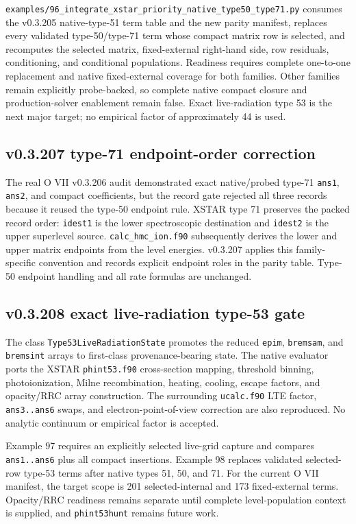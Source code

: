 \documentclass[11pt]{article}
\begin{document}
\texttt{examples/96\_integrate\_xstar\_priority\_native\_type50\_type71.py} consumes the v0.3.205 native-type-51 term table and the new parity manifest, replaces every validated type-50/type-71 term whose compact matrix row is selected, and recomputes the selected matrix, fixed-external right-hand side, row residuals, conditioning, and conditional populations. Readiness requires complete one-to-one replacement and native fixed-external coverage for both families. Other families remain explicitly probe-backed, so complete native compact closure and production-solver enablement remain false. Exact live-radiation type 53 is the next major target; no empirical factor of approximately 44 is used.

\subsection{v0.3.207 type-71 endpoint-order correction}

The real O VII v0.3.206 audit demonstrated exact native/probed type-71 \texttt{ans1}, \texttt{ans2}, and compact coefficients, but the record gate rejected all three records because it reused the type-50 endpoint rule. XSTAR type 71 preserves the packed record order: \texttt{idest1} is the lower spectroscopic destination and \texttt{idest2} is the upper superlevel source. \texttt{calc\_hmc\_ion.f90} subsequently derives the lower and upper matrix endpoints from the level energies. v0.3.207 applies this family-specific convention and records explicit endpoint roles in the parity table. Type-50 endpoint handling and all rate formulas are unchanged.



\subsection{v0.3.208 exact live-radiation type-53 gate}

The class \texttt{Type53LiveRadiationState} promotes the reduced \texttt{epim}, \texttt{bremsam}, and \texttt{bremsint} arrays to first-class provenance-bearing state. The native evaluator ports the XSTAR \texttt{phint53.f90} cross-section mapping, threshold binning, photoionization, Milne recombination, heating, cooling, escape factors, and opacity/RRC array construction. The surrounding \texttt{ucalc.f90} LTE factor, \texttt{ans3..ans6} swaps, and electron-point-of-view correction are also reproduced. No analytic continuum or empirical factor is accepted.

Example 97 requires an explicitly selected live-grid capture and compares \texttt{ans1..ans6} plus all compact insertions. Example 98 replaces validated selected-row type-53 terms after native types 51, 50, and 71. For the current O VII manifest, the target scope is 201 selected-internal and 173 fixed-external terms. Opacity/RRC readiness remains separate until complete level-population context is supplied, and \texttt{phint53hunt} remains future work.
\end{document}
